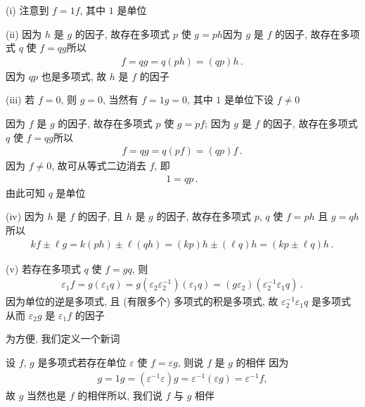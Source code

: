 \begin{pf}
    (i) 注意到 $f = 1f$, 其中 $1$ 是单位\period

    (ii) 因为 $h$ 是 $g$ 的因子, 故存在多项式 $p$ 使 $g = ph$\period 因为 $g$ 是 $f$ 的因子, 故存在多项式 $q$ 使 $f = qg$\period 所以
    \begin{align*}
        f = qg = q(ph) = (qp)h \period
    \end{align*}
    因为 $qp$ 也是多项式, 故 $h$ 是 $f$ 的因子\period

    (iii) 若 $f = 0$, 则 $g = 0$, 当然有 $f = 1 g = 0$, 其中 $1$ 是单位\period 下设 $f \neq 0$\period

    因为 $f$ 是 $g$ 的因子, 故存在多项式 $p$ 使 $g = pf$; 因为 $g$ 是 $f$ 的因子, 故存在多项式 $q$ 使 $f = qg$\period 所以
    \begin{align*}
        f = qg = q(pf) = (qp)f \period
    \end{align*}
    因为 $f \neq 0$, 故可从等式二边消去 $f$, 即
    \begin{align*}
        1 = qp \period
    \end{align*}
    由此可知 $q$ 是单位\period

    (iv) 因为 $h$ 是 $f$ 的因子, 且 $h$ 是 $g$ 的因子, 故存在多项式 $p$, $q$ 使 $f = ph$ 且 $g = qh$\period 所以
    \begin{align*}
        kf \pm \ell g = k(ph) \pm \ell (qh) = (kp) h \pm (\ell q) h = (kp \pm \ell q) h \period
    \end{align*}

    (v) 若存在多项式 $q$ 使 $f = gq$, 则
    \begin{align*}
        \varepsilon_1 f = g(\varepsilon_1 q) = g(\varepsilon_2 \varepsilon_2^{-1}) (\varepsilon_1 q) = (g\varepsilon_2) (\varepsilon_2^{-1} \varepsilon_1 q) \period
    \end{align*}
    因为单位的逆是多项式, 且 (有限多个) 多项式的积是多项式, 故 $\varepsilon_2^{-1} \varepsilon_1 q$ 是多项式\period 从而 $\varepsilon_2 g$ 是 $\varepsilon_1 f$ 的因子\period
\end{pf}

为方便, 我们定义一个新词\period

\begin{definition}
    设 $f$, $g$ 是多项式\period 若存在单位 $\varepsilon$ 使 $f = \varepsilon g$, 则说 $f$ 是 $g$ 的相伴 \period 因为
    \begin{align*}
        g = 1g = (\varepsilon^{-1} \varepsilon) g = \varepsilon^{-1} (\varepsilon g) = \varepsilon^{-1} f,
    \end{align*}
    故 $g$ 当然也是 $f$ 的相伴\period 所以, 我们说 $f$ 与 $g$ 相伴 \period
\end{definition}

